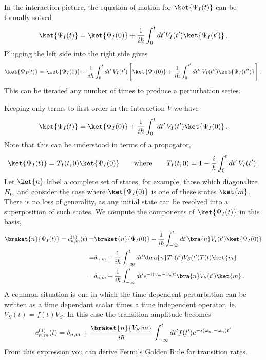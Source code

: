 
In the interaction picture, the equation of motion for $\ket{\Psi_{I}(t)}$ can be formally solved
\begin{equation}
  \ket{\Psi_I(t)}
  = \ket{\Psi_I(0)} + \frac{1}{i \hbar}\int_0^t dt' V_I(t') \ket{\Psi_I(t')}
  \, .
\end{equation}
Plugging the left side into the right side gives
\begin{equation}
  \ket{\Psi_I(t)}
  = \ket{\Psi_I(0)} + \frac{1}{i \hbar} \int_0^t dt' \, V_I(t') \left[ \ket{\Psi_{I}(0)} + \frac{1}{i \hbar} \int_0^{t'}dt'' \, V_I(t'') \ket{\Psi_I(t'')} \right]
  \, .
\end{equation}
This can be iterated any number of times to produce a perturbation series.

Keeping only terms to first order in the interaction $V$ we have
\begin{equation}
  \ket{\Psi_I(t)} = \ket{\Psi_I(0)} + \frac{1}{i \hbar} \int_0^t dt' \, V_I(t') \ket{\Psi_I(0)}
  \, .
\end{equation}
Note that this can be understood in terms of a propogator,
\begin{equation}
  \ket{\Psi_I(t)} = T_I(t,0) \ket{\Psi_I(0)}
  \qquad \text{where} \qquad
  T_I(t,0) = 1 - \frac{i}{\hbar} \int_0^t dt' \, V_I(t')
  \, .
\end{equation}
Let $\ket{n}$ label a complete set of states, for example, those which diagonalize $H_0$, and consider the case where $\ket{\Psi_I(0)}$ is one of these states $\ket{m}$.
There is no loss of generality, as any initial state can be resolved into a superposition of such states.
We compute the components of $\ket{\Psi_I(t)}$ in this basis,
\begin{align}
  \braket{n}{\Psi_I(t)} = c^{(1)}_{n,m}(t)
  =& \braket{n}{\Psi_I(0)} + \frac{1}{i\hbar} \int_{-\infty}^t dt' \bra{n} V_I(t') \ket{\Psi_I(0)} \nonumber \\
  =& \delta_{n,m} + \frac{1}{i \hbar}\int_{-\infty}^t dt' \bra{n}T^{\dagger}(t')V_S(t')T(t)\ket{m} \nonumber \\
  =& \delta_{n,m} + \frac{1}{i \hbar}\int_{-\infty}^t dt' e^{-i (\omega_m-\omega_n) t} \bra{n}V_S(t')\ket{m}
  \, .
\end{align}
A common situation is one in which the time dependent perturbation can be written as a time dependant scalar times a time independent operator, ie. $V_S(t) = f(t)V_S$. In this case the transition amplitude becomes
\begin{equation}
c^{(1)}_{n,m}(t) = \delta_{n,m} + \frac{\braket{n}{V_S|m}}{i \hbar}\int_{-\infty}^t dt' f(t') e^{-i(\omega_m - \omega_n)t'} \end{equation}
From this expression you can derive Fermi's Golden Rule for transition rates.


